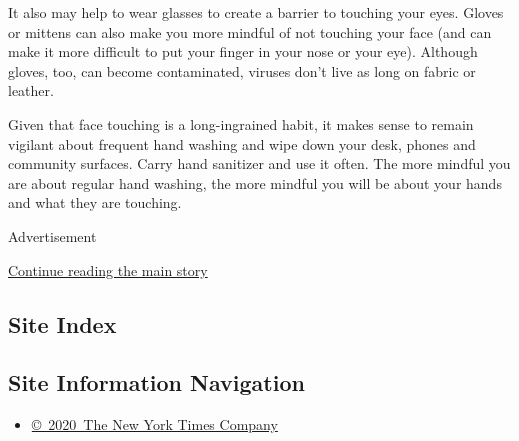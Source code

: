 It also may help to wear glasses to create a barrier to touching your
eyes. Gloves or mittens can also make you more mindful of not touching
your face (and can make it more difficult to put your finger in your
nose or your eye). Although gloves, too, can become contaminated,
viruses don't live as long on fabric or leather.

Given that face touching is a long-ingrained habit, it makes sense to
remain vigilant about frequent hand washing and wipe down your desk,
phones and community surfaces. Carry hand sanitizer and use it often.
The more mindful you are about regular hand washing, the more mindful
you will be about your hands and what they are touching.

Advertisement

\protect\hyperlink{after-bottom}{Continue reading the main story}

\hypertarget{site-index}{%
\subsection{Site Index}\label{site-index}}

\hypertarget{site-information-navigation}{%
\subsection{Site Information
Navigation}\label{site-information-navigation}}

\begin{itemize}
\tightlist
\item
  \href{https://help.nytimes3xbfgragh.onion/hc/en-us/articles/115014792127-Copyright-notice}{©~2020~The
  New York Times Company}
\end{itemize}

